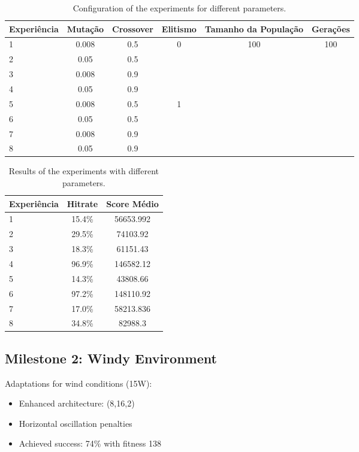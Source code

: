 \documentclass{article}
\begin{document}
\begin{table}[h]
\centering
\caption{Configuration of the experiments for different parameters.}
\begin{tabular}{|l|c|c|c|c|c|}
\hline
\textbf{Experiência} & \textbf{Mutação} & \textbf{Crossover} & \textbf{Elitismo} & \textbf{Tamanho da População} & \textbf{Gerações} \\ 
\hline
1 & 0.008 & 0.5 & \multirow{4}{*}{0} & \multirow{8}{*}{100} & \multirow{8}{*}{100} \\ 
\cline{1-3}
2 & 0.05 & 0.5 & & & \\ 
\cline{1-3}
3 & 0.008 & 0.9 & & & \\ 
\cline{1-3}
4 & 0.05 & 0.9 & & & \\ 
\cline{1-4}
5 & 0.008 & 0.5 & \multirow{4}{*}{1} & & \\ 
\cline{1-3}
6 & 0.05 & 0.5 & & & \\ 
\cline{1-3}
7 & 0.008 & 0.9 & & & \\ 
\cline{1-3}
8 & 0.05 & 0.9 & & & \\ 
\hline
\end{tabular}
\end{table}

\begin{table}[h]
\centering
\caption{Results of the experiments with different parameters.}
\begin{tabular}{|l|c|c|}
\hline
\textbf{Experiência} & \textbf{Hitrate} & \textbf{Score Médio} \\ \hline
1 & 15.4\% & 56653.992 \\ \hline
2 & 29.5\% & 74103.92 \\ \hline
3 & 18.3\% & 61151.43 \\ \hline
4 & 96.9\% & 146582.12 \\ \hline
5 & 14.3\% & 43808.66 \\ \hline
6 & 97.2\% & 148110.92 \\ \hline
7 & 17.0\% & 58213.836 \\ \hline
8 & 34.8\% & 82988.3 \\ \hline
\end{tabular}
\end{table}

\subsection{Milestone 2: Windy Environment}
Adaptations for wind conditions (15W):
\begin{itemize}
    \item Enhanced architecture: (8,16,2)
    \item Horizontal oscillation penalties
    \item Achieved success: 74\% with fitness 138
\end{itemize}
\end{document}
